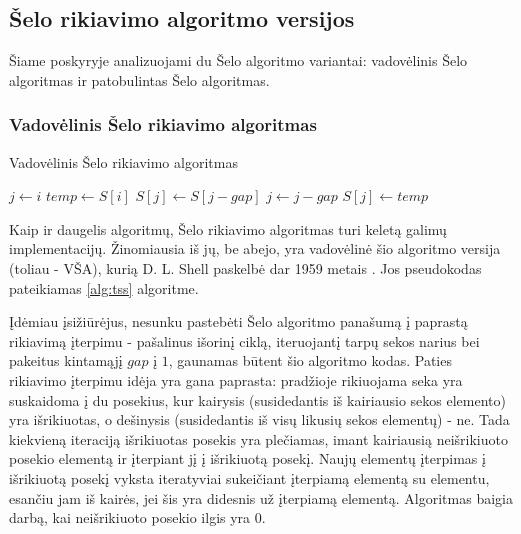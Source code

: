 \documentclass{VUMIFInfKursinis}
\begin{document}
\subsection{Šelo rikiavimo algoritmo versijos}

Šiame poskyryje analizuojami du Šelo algoritmo variantai: vadovėlinis Šelo algoritmas ir patobulintas Šelo algoritmas. 

\subsubsection{Vadovėlinis Šelo rikiavimo algoritmas}


\begin{algorithm}[H]
  \caption{Vadovėlinis Šelo rikiavimo algoritmas}\label{alg:tss}
  \begin{algorithmic}[1]
      \State $j\gets i$
      \State $temp\gets S[i]$\label{alg:tss:assign1}
      \label{alg:tss:while:start}
        \State $S[j]\gets S[j - gap]$
        \State $j\gets j-gap$
      \EndWhile\label{alg:tss:while:end}
      \State $S[j]\gets temp$\label{alg:tss:assign2}
    \EndFor
  \EndFor
  \end{algorithmic}
\end{algorithm}

Kaip ir daugelis algoritmų, Šelo rikiavimo algoritmas turi keletą galimų implementacijų.
Žinomiausia iš jų, be abejo, yra vadovėlinė šio algoritmo versija (toliau - VŠA),
kurią D. L. Shell paskelbė dar 1959 metais \cite{shell1959high}.
Jos pseudokodas pateikiamas \ref{alg:tss} algoritme.

Įdėmiau įsižiūrėjus, nesunku pastebėti Šelo algoritmo panašumą į paprastą rikiavimą įterpimu - pašalinus išorinį ciklą, iteruojantį tarpų sekos narius bei pakeitus
kintamąjį $gap$ į $1$, gaunamas būtent šio algoritmo kodas.
Paties rikiavimo įterpimu idėja yra gana paprasta: pradžioje rikiuojama seka yra suskaidoma į du posekius,
kur kairysis (susidedantis iš kairiausio sekos elemento) yra išrikiuotas, o dešinysis (susidedantis iš visų likusių sekos elementų) - ne.
Tada kiekvieną iteraciją išrikiuotas posekis yra plečiamas, imant kairiausią neišrikiuoto posekio elementą ir įterpiant jį į išrikiuotą posekį.
Naujų elementų įterpimas į išrikiuotą posekį vyksta iteratyviai sukeičiant įterpiamą elementą su elementu, esančiu jam iš kairės, jei šis yra didesnis už įterpiamą elementą.
Algoritmas baigia darbą, kai neišrikiuoto posekio ilgis yra 0.
\end{document}
